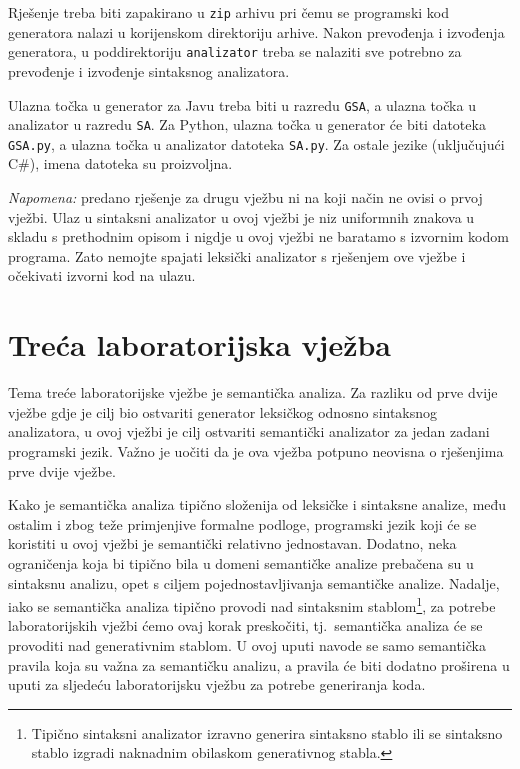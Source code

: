 \documentclass[times, 12pt, utf8]{book}
\begin{document}
Rješenje treba biti zapakirano u \texttt{zip} arhivu pri čemu se programski kod generatora nalazi u korijenskom direktoriju arhive.
Nakon prevođenja i izvođenja generatora, u poddirektoriju \texttt{analizator} treba se nalaziti sve potrebno za prevođenje i izvođenje sintaksnog analizatora.

Ulazna točka u generator za Javu treba biti u razredu \texttt{GSA}, a ulazna točka u analizator u razredu \texttt{SA}.
Za Python, ulazna točka u generator će biti datoteka \texttt{GSA.py}, a ulazna točka u analizator datoteka \texttt{SA.py}.
Za ostale jezike (uključujući C\#), imena datoteka su proizvoljna.

\emph{Napomena:} predano rješenje za drugu vježbu ni na koji način ne ovisi o prvoj vježbi. Ulaz u sintaksni analizator u ovoj vježbi je niz uniformnih znakova u skladu s prethodnim opisom i nigdje u ovoj vježbi ne baratamo s izvornim kodom programa. Zato nemojte spajati leksički analizator s rješenjem ove vježbe i očekivati izvorni kod na ulazu.


\chapter{Treća laboratorijska vježba}\label{chap:III}
Tema treće laboratorijske vježbe je semantička analiza.
Za razliku od prve dvije vježbe gdje je cilj bio ostvariti generator leksičkog odnosno sintaksnog analizatora, u ovoj vježbi je cilj ostvariti semantički analizator za jedan zadani programski jezik.
Važno je uočiti da je ova vježba potpuno neovisna o rješenjima prve dvije vježbe.

Kako je semantička analiza tipično složenija od leksičke i sintaksne analize, među ostalim i zbog teže primjenjive formalne podloge, programski jezik koji će se koristiti u ovoj vježbi je semantički relativno jednostavan.
Dodatno, neka ograničenja koja bi tipično bila u domeni semantičke analize prebačena su u sintaksnu analizu, opet s ciljem pojednostavljivanja semantičke analize.
Nadalje, iako se semantička analiza tipično provodi nad sintaksnim stablom\footnote{Tipično sintaksni analizator izravno generira sintaksno stablo ili se sintaksno stablo izgradi naknadnim obilaskom generativnog stabla.}, za potrebe laboratorijskih vježbi ćemo ovaj korak preskočiti, tj.~semantička analiza će se provoditi nad generativnim stablom.
U ovoj uputi navode se samo semantička pravila koja su važna za semantičku analizu, a pravila će biti dodatno proširena u uputi za sljedeću laboratorijsku vježbu za potrebe generiranja koda.
\end{document}
